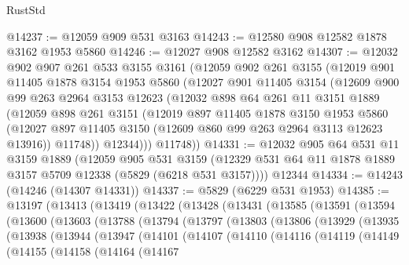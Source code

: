 \begin{lexlean}{RustStd}
\begin{coremodule}
@14237 := @12059 @909 @531 @3163
@14243 := @12580 @908 @12582 @1878 @3162 @1953 @5860
@14246 := @12027 @908 @12582 @3162
@14307 := @12032
    @902
    @907
    @261
    @533
    @3155
    @3161
    (@12059
      @902
      @261
      @3155
      (@12019
        @901
        @11405
        @1878
        @3154
        @1953
        @5860
        (@12027
          @901
          @11405
          @3154
          (@12609
            @900
            @99
            @263
            @2964
            @3153
            @12623
            (@12032
              @898
              @64
              @261
              @11
              @3151
              @1889
              (@12059
                @898
                @261
                @3151
                (@12019
                  @897
                  @11405
                  @1878
                  @3150
                  @1953
                  @5860
                  (@12027 @897 @11405 @3150 (@12609 @860 @99 @263 @2964 @3113 @12623 @13916))
                  @11748))
              @12344)))
        @11748))
@14331 := @12032
    @905
    @64
    @531
    @11
    @3159
    @1889
    (@12059
      @905
      @531
      @3159
      (@12329 @531 @64 @11 @1878 @1889 @3157 @5709 @12338 (@5829 (@6218 @531 @3157))))
    @12344
@14334 := @14243 (@14246 (@14307 @14331))
@14337 := @5829 (@6229 @531 @1953)
@14385 := @13197
    (@13413
      (@13419
        (@13422
          (@13428
            (@13431
              (@13585
                (@13591
                  (@13594
                    (@13600
                      (@13603
                        (@13788
                          (@13794
                            (@13797
                              (@13803
                                (@13806
                                  (@13929
                                    (@13935
                                      (@13938
                                        (@13944
                                          (@13947
                                            (@14101
                                              (@14107
                                                (@14110
                                                  (@14116
                                                    (@14119
                                                      (@14149
                                                        (@14155
                                                          (@14158
                                                            (@14164
                                                              (@14167

\end{coremodule}
\end{lexlean}
